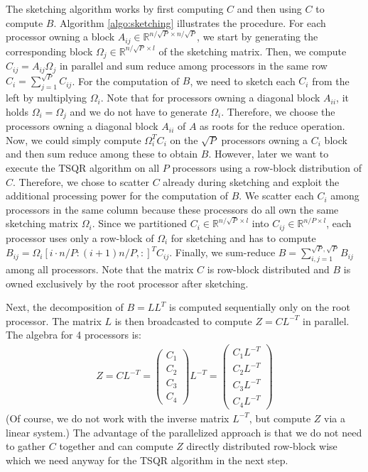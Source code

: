\documentclass{article}
\theoremstyle{definition}
\begin{document}
The sketching algorithm works by first computing $C$ and then using $C$ to compute $B$. Algorithm \ref{algo:sketching} illustrates the procedure. For each processor owning a block $A_{ij} \in \mathbb{R}^{n/\sqrt{P} \times n/\sqrt{P}}$, we start by generating the corresponding block $\Omega_j \in \mathbb{R}^{n/\sqrt{P} \times l}$ of the sketching matrix. Then, we compute $C_{ij} = A_{ij} \Omega_j$ in parallel and sum reduce among processors in the same row $C_i = \sum_{j = 1}^{\sqrt{P}} C_{ij}$. For the computation of $B$, we need to sketch each $C_i$ from the left by multiplying $\Omega_i$. Note that for processors owning a diagonal block $A_{ii}$, it holds $\Omega_i = \Omega_j$ and we do not have to generate $\Omega_i$. Therefore, we choose the processors owning a diagonal block $A_{ii}$ of $A$ as roots for the reduce operation. Now, we could simply compute $\Omega_i^T C_i$ on the $\sqrt{P}$ processors owning a $C_i$ block and then sum reduce among these to obtain $B$. However, later we want to execute the TSQR algorithm on all $P$ processors using a row-block distribution of $C$. Therefore, we chose to scatter $C$ already during sketching and exploit the additional processing power for the computation of $B$. We scatter each $C_i$ among processors in the same column because these processors do all own the same sketching matrix $\Omega_i$. Since we partitioned $C_i \in \mathbb{R}^{n/\sqrt{P} \times l}$ into $C_{ij} \in \mathbb{R}^{n/P \times l}$, each processor uses only a row-block of $\Omega_i$ for sketching and has to compute $B_{ij} = \Omega_i[i \cdot n/P : (i+1) n/P, :]^T C_{ij}$. Finally, we sum-reduce $B = \sum_{i,j = 1}^{\sqrt{P}, \sqrt{P}} B_{ij}$ among all processors. Note that the matrix $C$ is row-block distributed and $B$ is owned exclusively by the root processor after sketching.

Next, the decomposition of $B= LL^T$ is computed sequentially only on the root processor. The matrix $L$ is then broadcasted to compute $Z = C L^{-T}$ in parallel. The algebra for 4 processors is:
\begin{align*}
    Z = C L^{-T} 
    = \begin{pmatrix}
        C_1 \\
        C_2 \\
        C_3 \\
        C_4
    \end{pmatrix}
    L^{-T} 
    = \begin{pmatrix}
        C_1 L^{-T} \\
        C_2 L^{-T} \\
        C_3 L^{-T} \\
        C_4 L^{-T}
    \end{pmatrix}
\end{align*}
(Of course, we do not work with the inverse matrix $L^{-T}$, but compute $Z$ via a linear system.) The advantage of the parallelized approach is that we do not need to gather $C$ together and can compute $Z$ directly distributed row-block wise which we need anyway for the TSQR algorithm in the next step.
\end{document}

